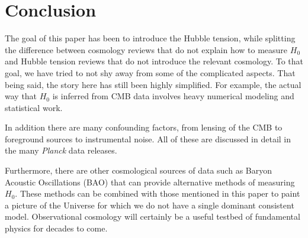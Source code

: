 \documentclass[12pt]{article}
\newcommand{\val}[1]{\cite{DiValentino2021} Sec.~#1}
\newcommand{\Planck}[1]{\textit{Planck}}
\begin{document}
%
%

\section{Conclusion} \label{sec:concl}

The goal of this paper has been to introduce the Hubble tension, while splitting the difference between cosmology reviews that do not explain how to measure $H_0$ and Hubble tension reviews that do not introduce the relevant cosmology. To that goal, we have tried to not shy away from some of the complicated aspects. That being said, the story here has still been highly simplified. For example, the actual way that $H_0$ is inferred from CMB data involves heavy numerical modeling and statistical work. 

In addition there are many confounding factors, from lensing of the CMB to foreground sources to instrumental noise. All of these are discussed in detail in the many \Planck{} data releases.

Furthermore, there are other cosmological sources of data such as Baryon Acoustic Oscillations (BAO) that can provide alternative methods of measuring $H_0$. These methods can be combined with those mentioned in this paper to paint a picture of the Universe for which we do not have a single dominant consistent model. Observational cosmology will certainly be a useful testbed of fundamental physics for decades to come.



\end{document}
